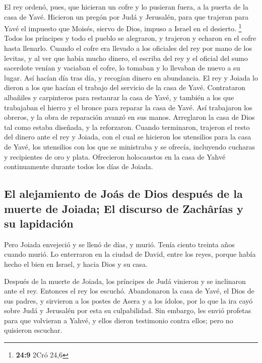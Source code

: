  El rey ordenó, pues, que hicieran un cofre y lo pusieran
fuera, a la puerta de la casa de Yavé.  Hicieron un pregón
por Judá y Jerusalén, para que trajeran para Yavé el impuesto que
Moisés, siervo de Dios, impuso a Israel en el desierto. \footnote{\textbf{24:9}
  2Cró 24,6}  Todos los príncipes y todo el pueblo se
alegraron, y trajeron y echaron en el cofre hasta llenarlo.
 Cuando el cofre era llevado a los oficiales del rey por
mano de los levitas, y al ver que había mucho dinero, el escriba del rey
y el oficial del sumo sacerdote venían y vaciaban el cofre, lo tomaban y
lo llevaban de nuevo a su lugar. Así hacían día tras día, y recogían
dinero en abundancia.  El rey y Joiada lo dieron a los
que hacían el trabajo del servicio de la casa de Yavé. Contrataron
albañiles y carpinteros para restaurar la casa de Yavé, y también a los
que trabajaban el hierro y el bronce para reparar la casa de Yavé.
 Así trabajaron los obreros, y la obra de reparación
avanzó en sus manos. Arreglaron la casa de Dios tal como estaba
diseñada, y la reforzaron.  Cuando terminaron, trajeron
el resto del dinero ante el rey y Joiada, con el cual se hicieron los
utensilios para la casa de Yavé, los utensilios con los que se
ministraba y se ofrecía, incluyendo cucharas y recipientes de oro y
plata. Ofrecieron holocaustos en la casa de Yahvé continuamente durante
todos los días de Joiada.

\hypertarget{el-alejamiento-de-jouxe1s-de-dios-despuuxe9s-de-la-muerte-de-joiada-el-discurso-de-zachuxe2ruxedas-y-su-lapidaciuxf3n}{%
\subsection{El alejamiento de Joás de Dios después de la muerte de
Joiada; El discurso de Zachârías y su
lapidación}\label{el-alejamiento-de-jouxe1s-de-dios-despuuxe9s-de-la-muerte-de-joiada-el-discurso-de-zachuxe2ruxedas-y-su-lapidaciuxf3n}}

 Pero Joiada envejeció y se llenó de días, y murió. Tenía
ciento treinta años cuando murió.  Lo enterraron en la
ciudad de David, entre los reyes, porque había hecho el bien en Israel,
y hacia Dios y su casa.

 Después de la muerte de Joiada, los príncipes de Judá
vinieron y se inclinaron ante el rey. Entonces el rey los escuchó.
 Abandonaron la casa de Yavé, el Dios de sus padres, y
sirvieron a los postes de Asera y a los ídolos, por lo que la ira cayó
sobre Judá y Jerusalén por esta su culpabilidad.  Sin
embargo, les envió profetas para que volvieran a Yahvé, y ellos dieron
testimonio contra ellos; pero no quisieron escuchar.

